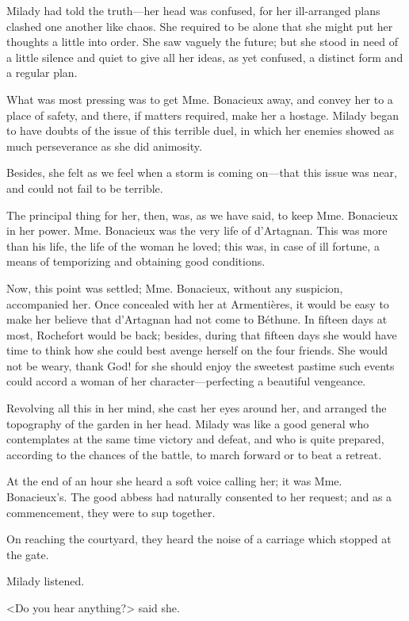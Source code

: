 Milady had told the truth---her head was confused, for her ill-arranged plans clashed one another like chaos. She required to be alone that she might put her thoughts a little into order. She saw vaguely the future; but she stood in need of a little silence and quiet to give all her ideas, as yet confused, a distinct form and a regular plan. 

What was most pressing was to get Mme. Bonacieux away, and convey her to a place of safety, and there, if matters required, make her a hostage. Milady began to have doubts of the issue of this terrible duel, in which her enemies showed as much perseverance as she did animosity. 

Besides, she felt as we feel when a storm is coming on---that this issue was near, and could not fail to be terrible. 

The principal thing for her, then, was, as we have said, to keep Mme. Bonacieux in her power. Mme. Bonacieux was the very life of d'Artagnan. This was more than his life, the life of the woman he loved; this was, in case of ill fortune, a means of temporizing and obtaining good conditions. 

Now, this point was settled; Mme. Bonacieux, without any suspicion, accompanied her. Once concealed with her at Armentières, it would be easy to make her believe that d'Artagnan had not come to Béthune. In fifteen days at most, Rochefort would be back; besides, during that fifteen days she would have time to think how she could best avenge herself on the four friends. She would not be weary, thank God! for she should enjoy the sweetest pastime such events could accord a woman of her character---perfecting a beautiful vengeance. 

Revolving all this in her mind, she cast her eyes around her, and arranged the topography of the garden in her head. Milady was like a good general who contemplates at the same time victory and defeat, and who is quite prepared, according to the chances of the battle, to march forward or to beat a retreat. 

At the end of an hour she heard a soft voice calling her; it was Mme. Bonacieux's. The good abbess had naturally consented to her request; and as a commencement, they were to sup together. 

On reaching the courtyard, they heard the noise of a carriage which stopped at the gate. 

Milady listened. 

<Do you hear anything?> said she. 

